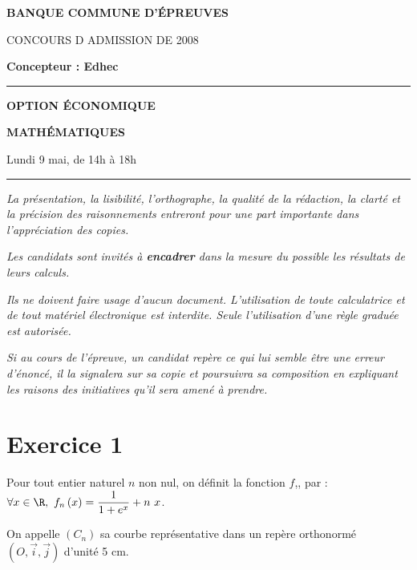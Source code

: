 \documentclass[11pt]{article}%
\begin{document}

\begin{center}
{\LARG\E\textbf{BANQUE COMMUNE D'ÉPREUVES}}



{\large \textsc{CONCOURS D ADMISSION DE 2008}}



{\large \textbf{Concepteur : Edhec}}



\rule{2.39cm}{0.05cm}



{\Large \textbf{OPTION ÉCONOMIQUE}}



{\Large \textbf{MATHÉMATIQUES }}



{\Large Lundi 9 mai, de 14h à 18h}



\rule{2.39cm}{0.05cm}
\end{center}

\textit{La présentation, la lisibilité, l'orthographe, la qualité
de la rédaction, la clarté et la précision des raisonnements
entreront pour une part importante dans l'appréciation des copies.}

\textit{Les candidats sont invités à \textbf{encadrer} dans la mesure
du possible les résultats de leurs calculs.}

\textit{Ils ne doivent faire usage d'aucun document. L'utilisation de
toute
calculatrice et de tout matériel électronique est interdite. Seule
l'utilisation d'une règle graduée est autorisée.}

\textit{Si au cours de l'épreuve, un candidat repère ce qui lui semble
être une erreur d'énoncé, il la signalera sur sa copie et
poursuivra sa composition en expliquant les raisons des initiatives
qu'il sera
amené à prendre.}

\vspace*{3cm}

\section*{Exercice 1}

Pour tout entier naturel $n$ non nul, on définit la fonction $f$,, par
: $\forall x\in \R,\ f_{n}\left( x\right) = \dfrac{1}{1 + e^{x}} +
n~x$.

On appelle $\left( C_{n}\right) $ sa courbe représentative dans un
repère orthonormé $\left( O,\vec{i},\vec{j}\right) $ d'unité 5 cm.
\end{document}
